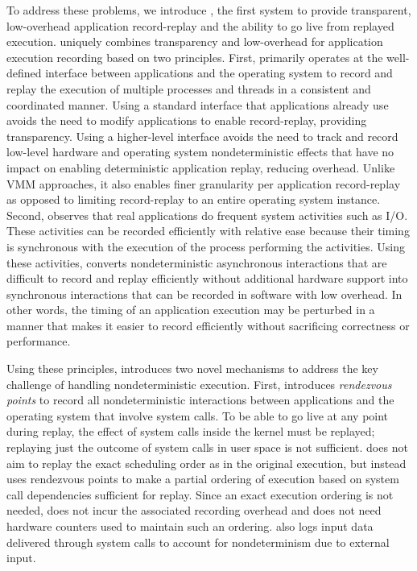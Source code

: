 To address these problems, we introduce \scribe{}, the first system
to provide transparent, low-overhead application record-replay and the
ability to go live from replayed execution.  \scribe{}
uniquely combines transparency and low-overhead for application
execution recording based on two principles.  First, \scribe{}
primarily operates at the well-defined interface between applications
and the operating system to record and replay the execution of
multiple processes and threads in a consistent and coordinated manner.
Using a standard interface that applications already use avoids the
need to modify applications to enable record-replay, providing
transparency.  Using a higher-level interface avoids the need to track
and record low-level hardware and operating system
nondeterministic effects that have no impact on enabling deterministic
application replay, reducing overhead. Unlike VMM approaches, it also
enables finer granularity per application record-replay as opposed to
limiting record-replay to an entire operating system instance.
Second, \scribe{} observes that real applications
do frequent system activities such as I/O.  These activities can be
recorded efficiently with relative ease because their timing is
synchronous with the execution of the process performing the
activities.  Using these activities, \scribe{} converts
nondeterministic asynchronous interactions that are difficult to
record and replay efficiently without additional hardware support into 
synchronous interactions that can be recorded in software with low
overhead.  In other words, the timing of an application execution may
be perturbed in a manner that makes it easier to record efficiently
without sacrificing correctness or performance.  

Using these principles, \scribe{} introduces two novel mechanisms to
address the key challenge of 
handling nondeterministic execution.
First, \scribe{} introduces {\em rendezvous points} to record all
nondeterministic interactions between applications and the operating
system that involve system calls.  To be able to go live at any point
during replay, the effect of system calls inside the kernel must be
replayed; replaying just the outcome of system calls in user space is
not sufficient.  \scribe{} does not aim to replay
the exact scheduling order as in the original execution, but instead
uses rendezvous points to make a partial ordering of execution
based on system call dependencies sufficient for replay.  Since an
exact execution ordering is not needed, \scribe{} does not incur the
associated recording overhead and does not need hardware counters used
to maintain such an ordering.  \scribe{} also logs input data
delivered through system calls to account for nondeterminism due to
external input. 

